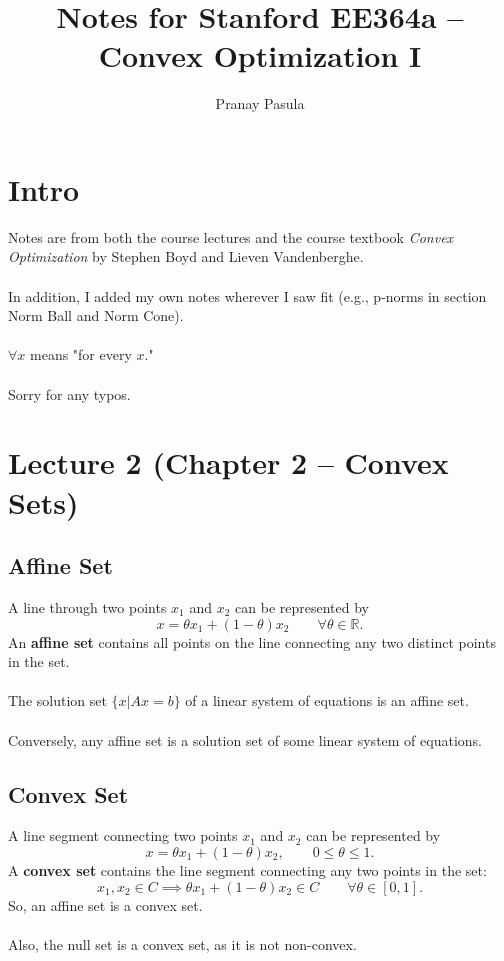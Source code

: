 \documentclass[]{article}
\title{Notes for Stanford EE364a -- Convex Optimization I}
\author{Pranay Pasula}
\begin{document}
\maketitle

\section*{Intro}
Notes are from both the course lectures and the course textbook \textit{Convex Optimization} by Stephen Boyd and Lieven Vandenberghe.
\\\\
In addition, I added my own notes wherever I saw fit (e.g., p-norms in section Norm Ball and Norm Cone). 
\\\\ 
$\forall x$ means "for every $x$." 
\\\\
Sorry for any typos.
\\
\section*{Lecture 2 (Chapter 2 -- Convex Sets)}

\subsection*{Affine Set}
A line through two points $x_{1}$ and $x_{2}$ can be represented by $$x=\theta x_{1} + (1-\theta) x_{2} \qquad \forall \theta \in \mathbb{R}. $$
An \textbf{affine set} contains all points on the line connecting any two distinct points in the set. \\\\
The solution set $\{x|Ax=b\}$ of a linear system of equations is an affine set. \\\\
Conversely, any affine set is a solution set of some linear system of equations. \\

\subsection*{Convex Set}
A line segment connecting two points $x_{1}$ and $x_{2}$ can be represented by $$x=\theta x_{1} + (1-\theta) x_{2}, \qquad  0\leq \theta \leq 1.$$
A \textbf{convex set} contains the line segment connecting any two points in the set:  $$x_{1}, x_{2} \in C \implies \theta x_{1} + (1-\theta) x_{2} \in C \qquad \forall \theta \in [0,1].$$
So, an affine set is a convex set. \\\\
Also, the null set is a convex set, as it is not non-convex. \\
\end{document}
